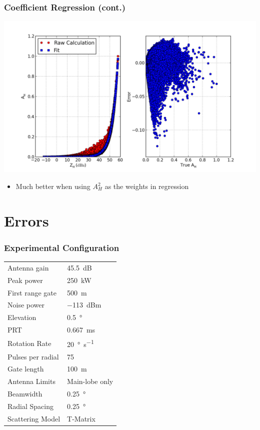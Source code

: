 \documentclass[red]{beamer}
\begin{document}
\begin{frame}
	\frametitle{Coefficient Regression (cont.)}
	\begin{center}
		\includegraphics[scale=0.35]{figures/weighted_power_law.png}
	\end{center}
	\begin{itemize}
		\item Much better when using $A_H^2$ as the weights in regression
	\end{itemize}
\end{frame}

\section{Errors}
\begin{frame}
	\frametitle{Experimental Configuration}
	\begin{center}
	    \begin{tabular}{ | l | l | }
	        \hline
	        Antenna gain & \SI{45.5}{dB} \\
	        Peak power & \SI{250}{\kilo\watt} \\
	        First range gate & \SI{500}{\meter} \\
	        Noise power & \SI{-113}{dBm} \\
	        Elevation & \SI{0.5}{\degree} \\
	        PRT & \SI{0.667}{\milli\second} \\
	        Rotation Rate & \SI{20}{\degree\per\second} \\
	        Pulses per radial & \num{75} \\
	        Gate length & \SI{100}{\meter} \\
	        Antenna Limits & Main-lobe only \\
			Beamwidth & \SI{0.25}{\degree} \\
			Radial Spacing & \SI{0.25}{\degree} \\
			Scattering Model & T-Matrix \\
			\hline
	    \end{tabular}
	\end{center}
\end{frame}
\end{document}
